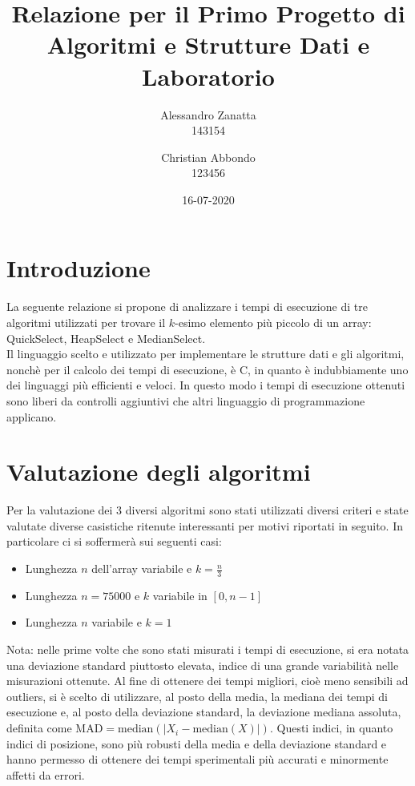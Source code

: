 \documentclass{article}
\title{Relazione per il Primo Progetto di Algoritmi e Strutture Dati e Laboratorio}
\date{16-07-2020}
\author{Alessandro Zanatta \\ 143154 \and Christian Abbondo \\ 123456}
\begin{document}
	\maketitle
	\newpage
	
	
	\tableofcontents	
	\newpage
	
	
	\section{Introduzione}
	La seguente relazione si propone di analizzare i tempi di esecuzione di tre algoritmi utilizzati per trovare il $ k $-esimo elemento più piccolo di un array: QuickSelect, HeapSelect e MedianSelect.
	\\ 
	Il linguaggio scelto e utilizzato per implementare le strutture dati e gli algoritmi, nonchè per il calcolo dei tempi di esecuzione, è C, in quanto è indubbiamente uno dei linguaggi più efficienti e veloci. In questo modo i tempi di esecuzione ottenuti sono liberi da controlli aggiuntivi che altri linguaggio di programmazione applicano.
	\newpage
	
	
	\section{Valutazione degli algoritmi}
	Per la valutazione dei 3 diversi algoritmi sono stati utilizzati diversi criteri e state valutate diverse casistiche ritenute interessanti per motivi riportati in seguito. In particolare ci si soffermerà sui seguenti casi:
	
	\begin{itemize}
		\item Lunghezza $n$ dell'array variabile e $k=\frac{n}{3}$
		\item Lunghezza $n=75000$ e $k$ variabile in $[0,n-1]$
		\item Lunghezza $n$ variabile e $k=1$
	\end{itemize}
	
	Nota: nelle prime volte che sono stati misurati i tempi di esecuzione, si era notata una deviazione standard piuttosto elevata, indice di una grande variabilità nelle misurazioni ottenute. Al fine di ottenere dei tempi migliori, cioè meno sensibili ad outliers, si è scelto di utilizzare, al posto della media, la mediana dei tempi di esecuzione e, al posto della deviazione standard, la deviazione mediana assoluta, definita come $\textrm{MAD}=\textrm{median}\left(\mathopen|X_{i}-\textrm{median}\left(X\right)\mathopen|\right)$. Questi indici, in quanto indici di posizione, sono più robusti della media e della deviazione standard e hanno permesso di ottenere dei tempi sperimentali più accurati e minormente affetti da errori.
	\newpage
\end{document}
